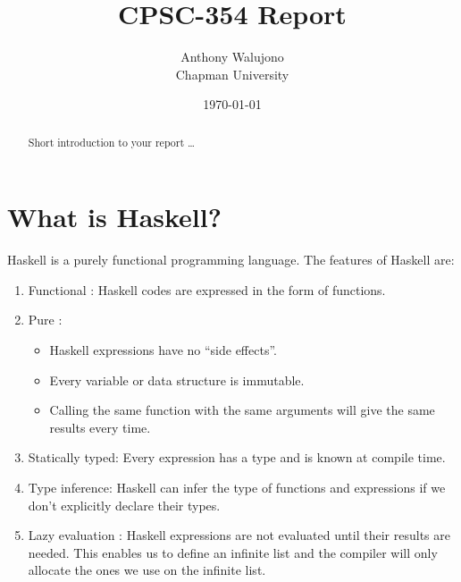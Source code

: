 \documentclass{article}
\title{CPSC-354 Report}
\author{Anthony Walujono  \\ Chapman University}
\date{\today}
\begin{document}
\maketitle

\begin{abstract}
Short introduction to your report \ldots 
\end{abstract}

\tableofcontents

\newpage
\section{What is Haskell?}\label{What is Haskell?}
Haskell is a purely functional programming language. The features of Haskell are:
\begin{enumerate}
  \item Functional : Haskell codes are expressed in the form of functions.
  \item Pure : 
  \begin{itemize}
    \item Haskell expressions have no “side effects”.
    \item Every variable or data structure is immutable.
    \item Calling the same function with the same arguments will give the same results every time.
  \end{itemize}
  \item Statically typed: Every expression has a type and is known at compile time.
  \item Type inference: Haskell can infer the type of functions and expressions if we don't explicitly declare their types.
  \item Lazy evaluation : Haskell expressions are not evaluated until their results are needed. This enables us to define an infinite list and the compiler will only allocate the ones we use on the infinite list.
\end{enumerate}
\end{document}
